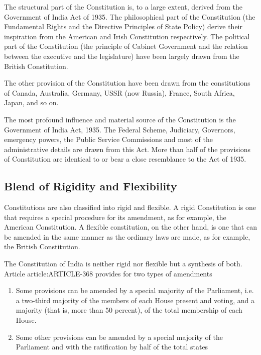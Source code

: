 \begin{multicols}{2}
The structural part of the Constitution is, to a large extent, derived from the Government of India Act of 1935. The philosophical part of the Constitution (the Fundamental Rights and the Directive Principles of State Policy) derive their inspiration from the American and Irish Constitution respectively. The political part of the Constitution (the principle of Cabinet Government and the relation between the executive and the legislature) have been largely drawn from the British Constitution.

The other provision of the Constitution have been drawn from the constitutions of Canada, Australia, Germany, USSR (now Russia), France, South Africa, Japan, and so on.

The most profound influence and material source of the Constitution is the Government of India Act, 1935. The Federal Scheme, Judiciary, Governors, emergency powers, the Public Service Commissions and most of the administrative details are drawn from this Act. More than half of the provisions of Constitution are identical to or bear a close resemblance to the Act of 1935.

\subsection{Blend of Rigidity and Flexibility}

Constitutions are also classified into rigid and flexible. A rigid Constitution is one that requires a special procedure for its amendment, as for example, the American Constitution. A flexible constitution, on the other hand, is one that can be amended in the same manner as the ordinary laws are made, as for example, the British Constitution.

The Constitution of India is neither rigid nor flexible but a synthesis of both. Article \gls{article:ARTICLE-368} provides for two types of amendments

\renewcommand{\labelenumi}{\textbf{(\alph{enumi})}}
\begin{enumerate}
  \item Some provisions can be amended by a special majority of the Parliament, i.e. a two-third majority of the members of each House present and voting, and a majority (that is, more than 50 percent), of the total membership of each House.
  \item Some other provisions can be amended by a special majority of the Parliament and with the ratification by half of the total states
\end{enumerate}


\end{multicols}

